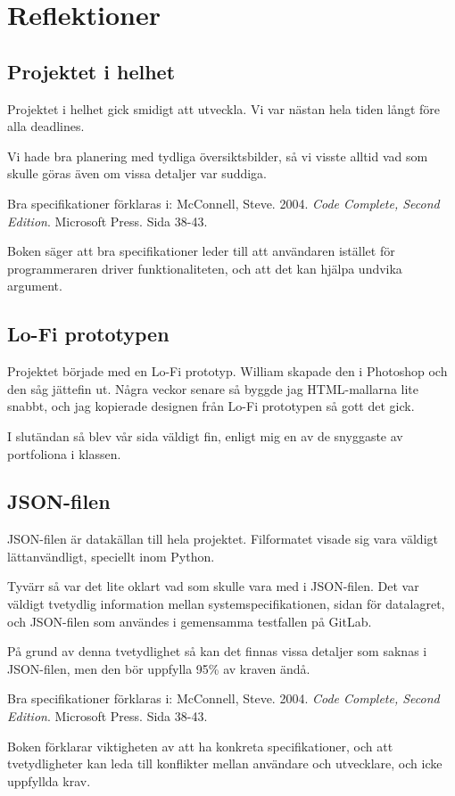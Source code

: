 \documentclass{TDP003mall}
\begin{document}
\section{Reflektioner}
\subsection{Projektet i helhet}
Projektet i helhet gick smidigt att utveckla. Vi var nästan hela tiden långt före alla deadlines.

Vi hade bra planering med tydliga översiktsbilder, så vi visste alltid vad som skulle göras även om vissa detaljer var suddiga.

Bra specifikationer förklaras i: McConnell, Steve. 2004. \textit{Code Complete, Second Edition}. Microsoft Press. Sida 38-43.

Boken säger att bra specifikationer leder till att användaren istället för programmeraren driver funktionaliteten, och att det kan hjälpa undvika argument.

\subsection{Lo-Fi prototypen}
Projektet började med en Lo-Fi prototyp. William skapade den i Photoshop och den såg jättefin ut. Några veckor senare så byggde jag HTML-mallarna lite snabbt, och jag kopierade designen från Lo-Fi prototypen så gott det gick.

I slutändan så blev vår sida väldigt fin, enligt mig en av de snyggaste av portfoliona i klassen.

\subsection{JSON-filen}
JSON-filen är datakällan till hela projektet. Filformatet visade sig vara väldigt lättanvändligt, speciellt inom Python.

Tyvärr så var det lite oklart vad som skulle vara med i JSON-filen. Det var väldigt tvetydlig information mellan systemspecifikationen, sidan för datalagret, och JSON-filen som användes i gemensamma testfallen på GitLab.

På grund av denna tvetydlighet så kan det finnas vissa detaljer som saknas i JSON-filen, men den bör uppfylla 95\% av kraven ändå.

Bra specifikationer förklaras i: McConnell, Steve. 2004. \textit{Code Complete, Second Edition}. Microsoft Press. Sida 38-43.

Boken förklarar viktigheten av att ha konkreta specifikationer, och att tvetydligheter kan leda till konflikter mellan användare och utvecklare, och icke uppfyllda krav.
\end{document}
